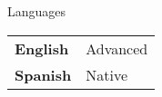 \documentclass[
	11pt, %
]{resume} %
\begin{document}

\begin{rSection}{Languages}

	\begin{tabular}{@{} >{\bfseries}l @{} l @{}}
		English & Advanced\\
		Spanish & Native\\
	\end{tabular}

\end{rSection}

\end{document}
